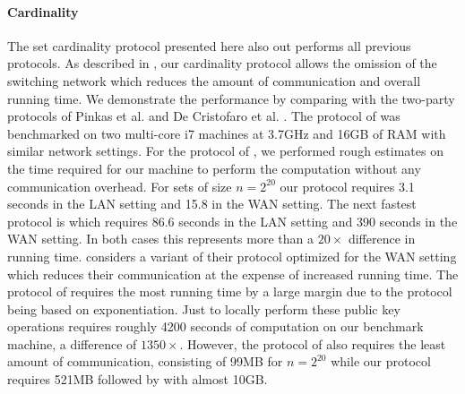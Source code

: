 \paragraph{Cardinality} The set cardinality protocol presented here also out performs all previous protocols. As described in , our cardinality protocol allows the omission of the switching network which reduces the amount of communication and overall running time. We demonstrate the performance by comparing with the two-party protocols of Pinkas et al. \cite{PSWW18} and De Cristofaro et al. \cite{DBLP:conf/cans/CristofaroGT12}. The protocol of  \cite{PSWW18} was benchmarked on two multi-core i7 machines at 3.7GHz and 16GB of RAM with similar network settings. For the protocol of \cite{DBLP:conf/cans/CristofaroGT12}, we performed rough estimates on the time required for our machine to perform the computation without any communication overhead. For sets of size $n=2^{20}$ our protocol requires 3.1 seconds in the LAN setting and 15.8 in the WAN setting. The next fastest protocol is \cite{PSWW18} which requires 86.6 seconds in the LAN setting and 390 seconds in the WAN setting. In both cases this represents more than a $20\times$ difference in running time.  \cite{PSWW18} considers a variant of their protocol optimized for the WAN setting which reduces their communication at the expense of increased running time. The protocol of \cite{DBLP:conf/cans/CristofaroGT12} requires the most running time by a large margin due to the protocol being based on exponentiation. Just to locally perform these public key operations requires roughly 4200 seconds of computation on our benchmark machine, a difference of $1350\times$. However, the protocol of \cite{DBLP:conf/cans/CristofaroGT12} also requires the least amount of communication, consisting of 99MB for $n=2^{20}$ while our protocol requires 521MB followed by \cite{PSWW18}  with almost 10GB.


